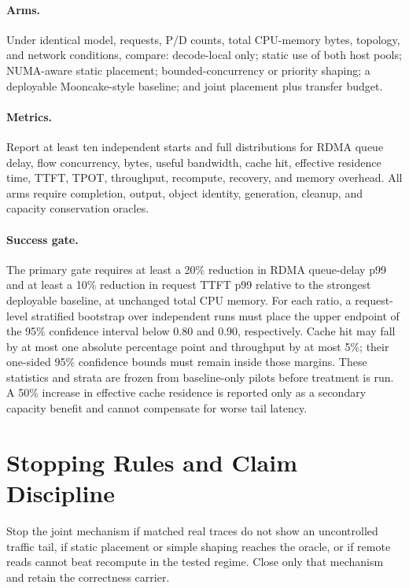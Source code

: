 \documentclass[10pt]{article}
\begin{document}
\paragraph{Arms.}
Under identical model, requests, P/D counts, total CPU-memory bytes, topology,
and network conditions, compare: decode-local only; static use of both host
pools; NUMA-aware static placement; bounded-concurrency or priority shaping;
a deployable Mooncake-style baseline; and joint placement plus transfer budget.

\paragraph{Metrics.}
Report at least ten independent starts and full distributions for RDMA queue
delay, flow concurrency, bytes, useful bandwidth, cache hit, effective
residence time, TTFT, TPOT, throughput, recompute, recovery, and memory overhead.
All arms require completion, output, object identity, generation, cleanup, and
capacity conservation oracles.

\paragraph{Success gate.}
The primary gate requires at least a 20\% reduction in RDMA queue-delay p99 and
at least a 10\% reduction in request TTFT p99 relative to the strongest
deployable baseline, at unchanged total CPU memory. For each ratio, a
request-level stratified bootstrap over independent runs must place the upper
endpoint of the 95\% confidence interval below $0.80$ and $0.90$,
respectively. Cache hit may fall by at most one absolute percentage point and
throughput by at most 5\%; their one-sided 95\% confidence bounds must remain
inside those margins. These statistics and strata are frozen from baseline-only
pilots before treatment is run. A 50\% increase in effective cache residence is
reported only as a secondary capacity benefit and cannot compensate for worse
tail latency.

\section{Stopping Rules and Claim Discipline}

Stop the joint mechanism if matched real traces do not show an uncontrolled
traffic tail, if static placement or simple shaping reaches the oracle, or if
remote reads cannot beat recompute in the tested regime. Close only that
mechanism and retain the correctness carrier.
\end{document}
